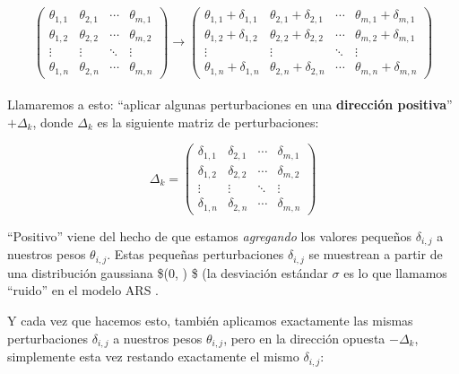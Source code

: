\documentclass[]{book}
\begin{document}
\[
\begin{pmatrix}
\theta_{1,1} & \theta_{2,1} & \cdots & \theta_{m,1} \\
\theta_{1,2} & \theta_{2,2} & \cdots & \theta_{m,2} \\
\vdots & \vdots & \ddots & \vdots \\
\theta_{1,n} & \theta_{2,n} & \cdots & \theta_{m,n}
\end{pmatrix}
\longrightarrow
\begin{pmatrix}
\theta_{1,1} + \delta_{1,1} & \theta_{2,1} + \delta_{2,1} & \cdots & \theta_{m,1} + \delta_{m,1} \\
\theta_{1,2} + \delta_{1,2} & \theta_{2,2} + \delta_{2,2} & \cdots & \theta_{m,2} + \delta_{m,1} \\
\vdots & \vdots & \ddots & \vdots \\
\theta_{1,n} + \delta_{1,n} & \theta_{2,n} + \delta_{2,n} & \cdots & \theta_{m,n} + \delta_{m,n}
\end{pmatrix}
\]\\

Llamaremos a esto: ``aplicar algunas perturbaciones en una \textbf{dirección positiva}'' \(+\Delta_k\), donde \(\Delta_k\) es la siguiente matriz de perturbaciones:

\[
\Delta_k
=
\begin{pmatrix}
\delta_{1,1} & \delta_{2,1} & \cdots & \delta_{m,1} \\
\delta_{1,2} & \delta_{2,2} & \cdots & \delta_{m,2} \\
\vdots & \vdots & \ddots & \vdots \\
\delta_{1,n} & \delta_{2,n} & \cdots & \delta_{m,n}
\end{pmatrix}
\]

``Positivo'' viene del hecho de que estamos \emph{agregando} los valores pequeños \(\delta_{i, j}\) a nuestros pesos \(\theta_{i, j}\). Estas pequeñas perturbaciones \(\delta_{i, j}\) se muestrean a partir de una distribución gaussiana \$(0, \sigma) \$ (la desviación estándar \(\sigma\) es lo que llamamos ``ruido'' en el modelo ARS .

Y cada vez que hacemos esto, también aplicamos exactamente las mismas perturbaciones \(\delta_{i, j}\) a nuestros pesos \(\theta_{i, j}\), pero en la dirección opuesta \(-\Delta_k\), simplemente esta vez restando exactamente el mismo \(\delta_{i, j}\):
\end{document}
